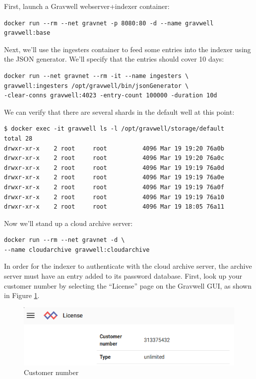 First, launch a Gravwell webserver+indexer container:

\begin{Verbatim}[breaklines=true]
docker run --rm --net gravnet -p 8080:80 -d --name gravwell gravwell:base
\end{Verbatim}

Next, we'll use the ingesters container to feed some entries into the
indexer using the JSON generator. We'll specify that the entries should
cover 10 days:

\begin{Verbatim}[breaklines=true]
docker run --net gravnet --rm -it --name ingesters \
gravwell:ingesters /opt/gravwell/bin/jsonGenerator \
-clear-conns gravwell:4023 -entry-count 100000 -duration 10d
\end{Verbatim}

We can verify that there are several shards in the default well at this
point:

\begin{Verbatim}[breaklines=true]
$ docker exec -it gravwell ls -l /opt/gravwell/storage/default
total 28
drwxr-xr-x    2 root     root          4096 Mar 19 19:20 76a0b
drwxr-xr-x    2 root     root          4096 Mar 19 19:20 76a0c
drwxr-xr-x    2 root     root          4096 Mar 19 19:19 76a0d
drwxr-xr-x    2 root     root          4096 Mar 19 19:19 76a0e
drwxr-xr-x    2 root     root          4096 Mar 19 19:19 76a0f
drwxr-xr-x    2 root     root          4096 Mar 19 19:19 76a10
drwxr-xr-x    2 root     root          4096 Mar 19 18:05 76a11
\end{Verbatim}

Now we'll stand up a cloud archive server:

\begin{Verbatim}[breaklines=true]
docker run --rm --net gravnet -d \
--name cloudarchive gravwell:cloudarchive
\end{Verbatim}

In order for the indexer to authenticate with the cloud archive server,
the archive server must have an entry added to its password database.
First, look up your customer number by selecting the ``License'' page on
the Gravwell GUI, as shown in Figure \ref{fig:cust-num}.

\begin{figure}
	\includegraphics{images/cust-num.png}
	\caption{Customer number}
	\label{fig:cust-num}
\end{figure}

